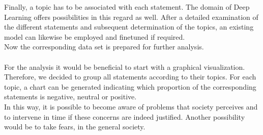Finally, a topic has to be associated with each statement.
The domain of Deep Learning offers possibilities in this regard as well.
After a detailed examination of the different statements and subsequent determination of the topics, an existing model can likewise be employed and finetuned if required.
\\
Now the corresponding data set is prepared for further analysis.
\\
\\
For the analysis it would be beneficial to start with a graphical visualization.
Therefore, we decided to group all statements according to their topics.
For each topic, a chart can be generated indicating which proportion of the corresponding statements is negative, neutral or positive.
\\
In this way, it is possible to become aware of problems that society perceives and to intervene in time if these concerns are indeed justified. Another possibility would be to take fears, in the general society.

\begin{table}
\setlength\tabcolsep{2pt} %
\footnotesize\centering
\captionsetup{size=footnotesize}
\resizebox{\columnwidth}{!}{%
\begin{tabular}{
    ccc}

\hline

\textbf{statement} & \textbf{Sentiment} & \textbf{Topic} \\
\hline
AI can be a risk for many workers. & NEG & job market \\
AI will definitely revolutionize games! & POS &  gaming\\
... & ... & ... \\
\hline
\end{tabular}}
\caption{\label{data-schema}
Data schema for visualization and analysis
}
\end{table}
